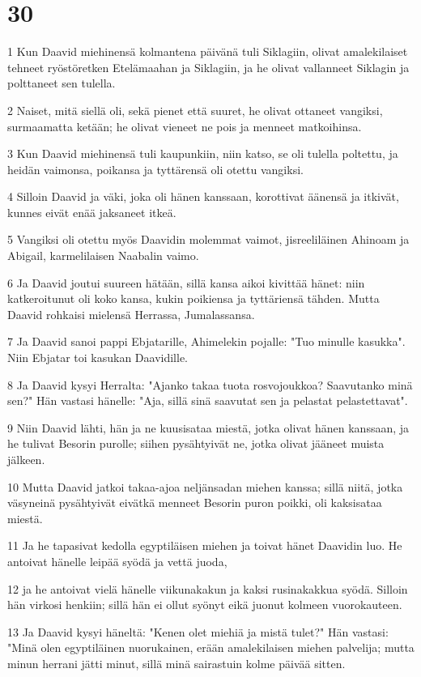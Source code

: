 \chapter{30}

\par 1 Kun Daavid miehinensä kolmantena päivänä tuli Siklagiin, olivat amalekilaiset tehneet ryöstöretken Etelämaahan ja Siklagiin, ja he olivat vallanneet Siklagin ja polttaneet sen tulella.
\par 2 Naiset, mitä siellä oli, sekä pienet että suuret, he olivat ottaneet vangiksi, surmaamatta ketään; he olivat vieneet ne pois ja menneet matkoihinsa.
\par 3 Kun Daavid miehinensä tuli kaupunkiin, niin katso, se oli tulella poltettu, ja heidän vaimonsa, poikansa ja tyttärensä oli otettu vangiksi.
\par 4 Silloin Daavid ja väki, joka oli hänen kanssaan, korottivat äänensä ja itkivät, kunnes eivät enää jaksaneet itkeä.
\par 5 Vangiksi oli otettu myös Daavidin molemmat vaimot, jisreeliläinen Ahinoam ja Abigail, karmelilaisen Naabalin vaimo.
\par 6 Ja Daavid joutui suureen hätään, sillä kansa aikoi kivittää hänet: niin katkeroitunut oli koko kansa, kukin poikiensa ja tyttäriensä tähden. Mutta Daavid rohkaisi mielensä Herrassa, Jumalassansa.
\par 7 Ja Daavid sanoi pappi Ebjatarille, Ahimelekin pojalle: "Tuo minulle kasukka". Niin Ebjatar toi kasukan Daavidille.
\par 8 Ja Daavid kysyi Herralta: "Ajanko takaa tuota rosvojoukkoa? Saavutanko minä sen?" Hän vastasi hänelle: "Aja, sillä sinä saavutat sen ja pelastat pelastettavat".
\par 9 Niin Daavid lähti, hän ja ne kuusisataa miestä, jotka olivat hänen kanssaan, ja he tulivat Besorin purolle; siihen pysähtyivät ne, jotka olivat jääneet muista jälkeen.
\par 10 Mutta Daavid jatkoi takaa-ajoa neljänsadan miehen kanssa; sillä niitä, jotka väsyneinä pysähtyivät eivätkä menneet Besorin puron poikki, oli kaksisataa miestä.
\par 11 Ja he tapasivat kedolla egyptiläisen miehen ja toivat hänet Daavidin luo. He antoivat hänelle leipää syödä ja vettä juoda,
\par 12 ja he antoivat vielä hänelle viikunakakun ja kaksi rusinakakkua syödä. Silloin hän virkosi henkiin; sillä hän ei ollut syönyt eikä juonut kolmeen vuorokauteen.
\par 13 Ja Daavid kysyi häneltä: "Kenen olet miehiä ja mistä tulet?" Hän vastasi: "Minä olen egyptiläinen nuorukainen, erään amalekilaisen miehen palvelija; mutta minun herrani jätti minut, sillä minä sairastuin kolme päivää sitten.
